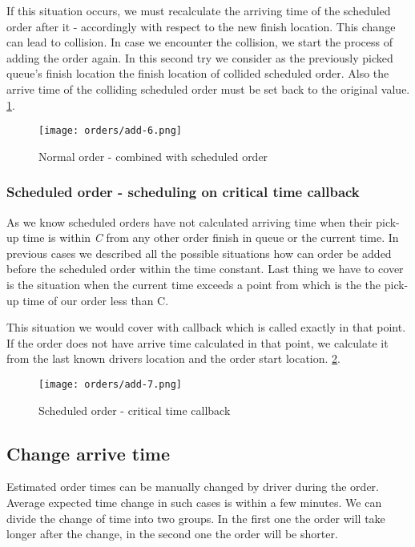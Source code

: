 	If this situation occurs, we must recalculate the arriving time of the scheduled order after it -  accordingly with respect to the new finish location. This change can lead to collision. In case we encounter the collision, we start the process of adding the order again. In this second try we consider as the previously picked queue's finish location the finish location of collided scheduled order. Also the arrive time of the colliding scheduled order must be set back to the original value. 
	 \ref{order-process-normal-order-combined-with-scheduled}.
	
	\begin{figure}[h]\centering
		\texttt{[image: orders/add-6.png]}
		\caption{Normal order - combined with scheduled order} 
		\label{order-process-normal-order-combined-with-scheduled}
	\end{figure} 

	\subsubsection{Scheduled order - scheduling on critical time callback}
	As we know scheduled orders have not calculated arriving time when their pick-up time is within \textit{C} from any other order finish in queue or the current time. In previous cases we described all the possible situations how can order be added before the scheduled order within the time constant. Last thing we have to cover is the situation when the current time exceeds a point from which is the the pick-up time of our order less than C.
	
	This situation we would cover with callback which is called exactly in that point. If the order does not have arrive time calculated in that point, we calculate it from the last known drivers location and the order start location. 
	 \ref{order-process-scheduled-critical-time}.

	\begin{figure}[h]\centering
		\texttt{[image: orders/add-7.png]}
		\caption{Scheduled order - critical time callback} 
		\label{order-process-scheduled-critical-time}
	\end{figure} 

\subsection{Change arrive time}
	Estimated order times can be manually changed by driver during the order. Average expected time change in such cases is within a few minutes. We can divide the change of time into two groups. In the first one the order will take longer after the change, in the second one the order will be shorter.
	
